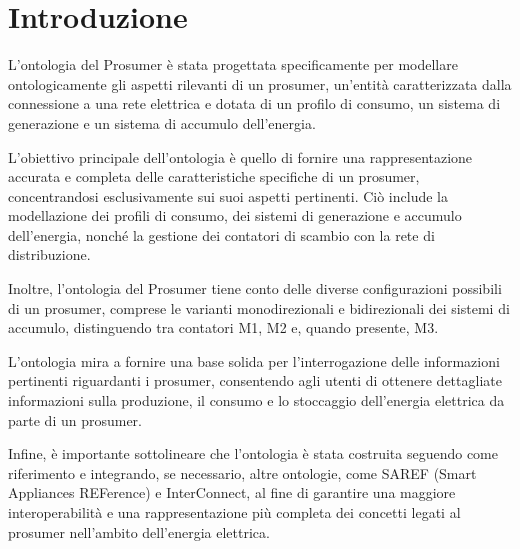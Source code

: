 \chapter{Introduzione}

L'ontologia del Prosumer è stata progettata specificamente per modellare ontologicamente gli aspetti rilevanti di un prosumer, un'entità caratterizzata dalla connessione a una rete elettrica e dotata di un profilo di consumo, un sistema di generazione e un sistema di accumulo dell'energia.

L'obiettivo principale dell'ontologia è quello di fornire una rappresentazione accurata e completa delle caratteristiche specifiche di un prosumer, concentrandosi esclusivamente sui suoi aspetti pertinenti. Ciò include la modellazione dei profili di consumo, dei sistemi di generazione e accumulo dell'energia, nonché la gestione dei contatori di scambio con la rete di distribuzione.

Inoltre, l'ontologia del Prosumer tiene conto delle diverse configurazioni possibili di un prosumer, comprese le varianti monodirezionali e bidirezionali dei sistemi di accumulo, distinguendo tra contatori M1, M2 e, quando presente, M3.

L'ontologia mira a fornire una base solida per l'interrogazione delle informazioni pertinenti riguardanti i prosumer, consentendo agli utenti di ottenere dettagliate informazioni sulla produzione, il consumo e lo stoccaggio dell'energia elettrica da parte di un prosumer.

Infine, è importante sottolineare che l'ontologia è stata costruita seguendo come riferimento e integrando, se necessario, altre ontologie, come SAREF (Smart Appliances REFerence) e InterConnect, al fine di garantire una maggiore interoperabilità e una rappresentazione più completa dei concetti legati al prosumer nell'ambito dell'energia elettrica.